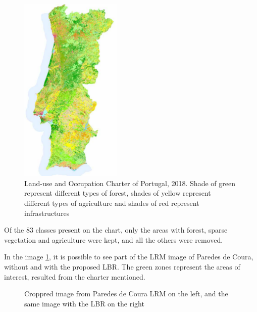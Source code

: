 \begin{figure}[H]
\centering
\includegraphics[height=9cm]{images/carta/cartaPortugal.png}
\caption{Land-use and Occupation Charter of Portugal, 2018. Shade of green represent different types of forest, shades of yellow represent different types of agriculture and shades of red represent infrastructures}
\end{figure}

Of the 83 classes present on the chart, only the areas with forest, sparse vegetation and agriculture were kept, and all the others were removed.

In the image \ref{Croppred image from Paredes de Coura LRM on the left, and the same image with the LBR on the right}, it is possible to see part of the LRM image of Paredes de Coura, without and with the proposed LBR. The green zones represent the areas of interest, resulted from the charter mentioned.


\begin{figure}[H]
    \centering
    \qquad
    \caption{Croppred image from Paredes de Coura LRM on the left, and the same image with the LBR on the right}%
    \label{Croppred image from Paredes de Coura LRM on the left, and the same image with the LBR on the right}
\end{figure}

